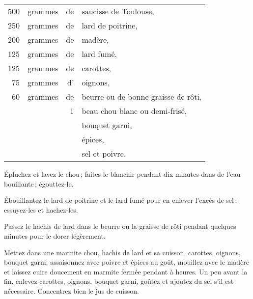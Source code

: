 \footnotesize
\begin{longtable}{rrrp{16em}}
    500 & grammes & de & saucisse de Toulouse,                                                            \\
    250 & grammes & de & lard de poitrine,                                                                \\
    200 & grammes & de & madère,                                                                          \\
    125 & grammes & de & lard fumé,                                                                       \\
    125 & grammes & de & carottes,                                                                        \\
     75 & grammes & d' & oignons,                                                                         \\
     60 & grammes & de & beurre ou de bonne graisse de rôti,                                              \\
        &         &  1 & beau chou blanc ou demi-frisé,                                                   \\
        &         &    & bouquet garni,                                                                   \\
        &         &    & épices,                                                                          \\
        &         &    & sel et poivre.                                                                   \\
\end{longtable}
\normalsize

Épluchez et lavez le chou ; faites-le blanchir pendant dix minutes dans de
l'eau bouillante ; égouttez-le.

Ébouillantez le lard de poitrine et le lard fumé pour en enlever l'excès de
sel ; essuyez-les et hachez-les.

Passez le hachis de lard dans le beurre ou la graisse de rôti pendant quelques
minutes pour le dorer légèrement.

Mettez dans une marmite chou, hachis de lard et sa cuisson, carottes, oignons,
bouquet garni, assaisonnez avec poivre et épices au goût, mouillez avec le
madère et laissez cuire doucement en marmite fermée pendant {\mmm}
à {\mmm} heures. Un peu avant la fin, enlevez carottes, oignons, bouquet
garni, goûtez et ajoutez du sel s'il est nécessaire. Concentrez bien le jus de
cuisson.

